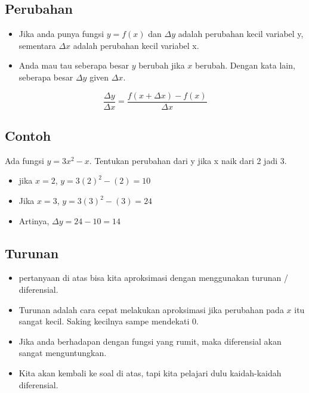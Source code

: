 \documentclass[
  letterpaper,
  DIV=11,
  numbers=noendperiod]{scrartcl}
\begin{document}
\subsection{Perubahan}\label{perubahan}

\begin{itemize}
\item
  Jika anda punya fungsi \(y=f(x)\) dan \(\Delta y\) adalah perubahan
  kecil variabel y, sementara \(\Delta x\) adalah perubahan kecil
  variabel x.
\item
  Anda mau tau seberapa besar \(y\) berubah jika \(x\) berubah. Dengan
  kata lain, seberapa besar \(\Delta y\) given \(\Delta x\).
\end{itemize}

\[
\frac{\Delta y}{\Delta x}=\frac{f(x+\Delta x)-f(x)}{\Delta x}
\]

\subsection{Contoh}\label{contoh-5}

Ada fungsi \(y=3x^2-x\). Tentukan perubahan dari y jika x naik dari 2
jadi 3.

\begin{itemize}
\item
  jika \(x=2\), \(y=3(2)^2-(2)=10\)
\item
  Jika \(x=3\), \(y=3(3)^2-(3)=24\)
\item
  Artinya, \(\Delta y=24-10=14\)
\end{itemize}

\subsection{Turunan}\label{turunan}

\begin{itemize}
\item
  pertanyaan di atas bisa kita aproksimasi dengan menggunakan turunan /
  diferensial.
\item
  Turunan adalah cara cepat melakukan aproksimasi jika perubahan pada
  \(x\) itu sangat kecil. Saking kecilnya sampe mendekati 0.
\item
  Jika anda berhadapan dengan fungsi yang rumit, maka diferensial akan
  sangat menguntungkan.
\item
  Kita akan kembali ke soal di atas, tapi kita pelajari dulu
  kaidah-kaidah diferensial.
\end{itemize}
\end{document}
